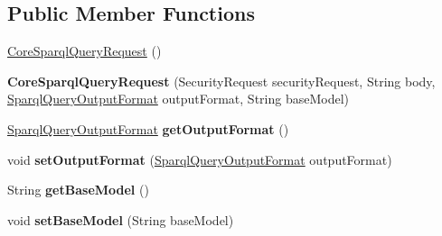 \subsection*{Public Member Functions}
\begin{DoxyCompactItemize}
\item 
\hyperlink{classeu_1_1h2020_1_1symbiote_1_1core_1_1internal_1_1CoreSparqlQueryRequest_a855c39c53d50de118f4df279eb2b01f3}{Core\+Sparql\+Query\+Request} ()
\item 
\mbox{\label{classeu_1_1h2020_1_1symbiote_1_1core_1_1internal_1_1CoreSparqlQueryRequest_ab9820333484053d20a0dd666491ee3fb}} 
{\bfseries Core\+Sparql\+Query\+Request} (Security\+Request security\+Request, String body, \hyperlink{enumeu_1_1h2020_1_1symbiote_1_1core_1_1ci_1_1SparqlQueryOutputFormat}{Sparql\+Query\+Output\+Format} output\+Format, String base\+Model)
\item 
\mbox{\label{classeu_1_1h2020_1_1symbiote_1_1core_1_1internal_1_1CoreSparqlQueryRequest_a6dea88c23c51a92340e6344cce3fabd0}} 
\hyperlink{enumeu_1_1h2020_1_1symbiote_1_1core_1_1ci_1_1SparqlQueryOutputFormat}{Sparql\+Query\+Output\+Format} {\bfseries get\+Output\+Format} ()
\item 
\mbox{\label{classeu_1_1h2020_1_1symbiote_1_1core_1_1internal_1_1CoreSparqlQueryRequest_a8cacb1ea4211122d5297922f050400ae}} 
void {\bfseries set\+Output\+Format} (\hyperlink{enumeu_1_1h2020_1_1symbiote_1_1core_1_1ci_1_1SparqlQueryOutputFormat}{Sparql\+Query\+Output\+Format} output\+Format)
\item 
\mbox{\label{classeu_1_1h2020_1_1symbiote_1_1core_1_1internal_1_1CoreSparqlQueryRequest_a2711243c6736fa3c9701ae969614dd3c}} 
String {\bfseries get\+Base\+Model} ()
\item 
\mbox{\label{classeu_1_1h2020_1_1symbiote_1_1core_1_1internal_1_1CoreSparqlQueryRequest_a54cbff1b7716823d0d77f3285ba53743}} 
void {\bfseries set\+Base\+Model} (String base\+Model)
\end{DoxyCompactItemize}


